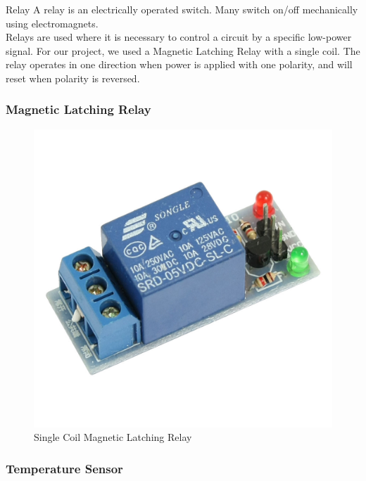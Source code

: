 \documentclass[10pt]{beamer}
\begin{document}
{
	\begin{frame}{Relay}
		A relay is an electrically operated switch. Many switch on/off mechanically using electromagnets.   \\
		\vspace{5mm}
		Relays are used where it is necessary to control a circuit by a specific low-power signal. For our project, we used a Magnetic Latching Relay with a single coil. The relay operates in one direction when power is applied with one polarity, and will reset when polarity is reversed. 
	\end{frame}
}
{
	\begin{frame}
		\frametitle{Magnetic Latching Relay}
		\begin{figure}
			\includegraphics[scale=0.15]{images/relay}
			\caption{Single Coil Magnetic Latching Relay}
		\end{figure}
	\end{frame}
{
	\begin{frame}
		\frametitle{Temperature Sensor}
		\begin{figure}[h!]

\end{figure}
\end{frame}}}
\end{document}
